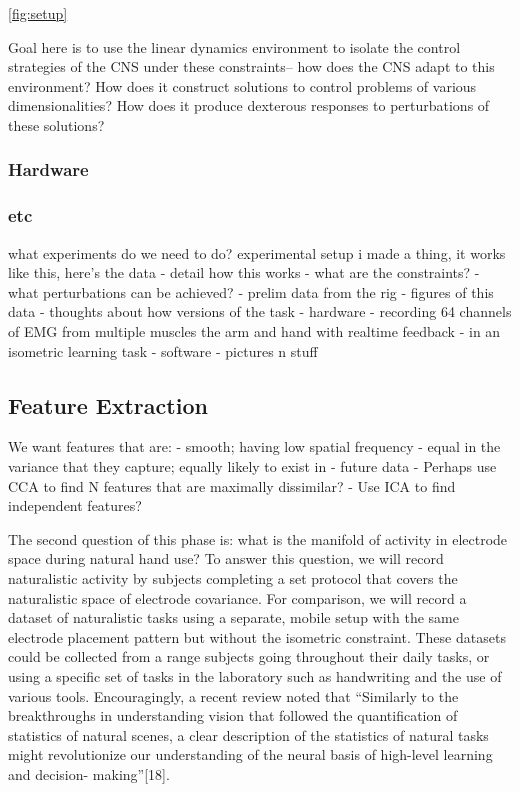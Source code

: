 \documentclass[
  a4paper,
]{article}
\begin{document}
\cref{fig:setup}

Goal here is to use the linear dynamics environment to isolate the
control strategies of the CNS under these constraints-- how does the CNS
adapt to this environment? How does it construct solutions to control
problems of various dimensionalities? How does it produce dexterous
responses to perturbations of these solutions?

\hypertarget{hardware}{%
\subsubsection{Hardware}\label{hardware}}

\hypertarget{etc}{%
\subsubsection{etc}\label{etc}}

what experiments do we need to do? experimental setup i made a thing, it
works like this, here's the data - detail how this works - what are the
constraints? - what perturbations can be achieved? - prelim data from
the rig - figures of this data - thoughts about how versions of the task
- hardware - recording 64 channels of EMG from multiple muscles the arm
and hand with realtime feedback - in an isometric learning task -
software - pictures n stuff

\hypertarget{feature-extraction}{%
\subsection{Feature Extraction}\label{feature-extraction}}

We want features that are: - smooth; having low spatial frequency -
equal in the variance that they capture; equally likely to exist in -
future data - Perhaps use CCA to find N features that are maximally
dissimilar? - Use ICA to find independent features?

The second question of this phase is: what is the manifold of activity
in electrode space during natural hand use? To answer this question, we
will record naturalistic activity by subjects completing a set protocol
that covers the naturalistic space of electrode covariance. For
comparison, we will record a dataset of naturalistic tasks using a
separate, mobile setup with the same electrode placement pattern but
without the isometric constraint. These datasets could be collected from
a range subjects going throughout their daily tasks, or using a specific
set of tasks in the laboratory such as handwriting and the use of
various tools. Encouragingly, a recent review noted that ``Similarly to
the breakthroughs in understanding vision that followed the
quantification of statistics of natural scenes, a clear description of
the statistics of natural tasks might revolutionize our understanding of
the neural basis of high-level learning and decision- making''{[}18{]}.
\end{document}
